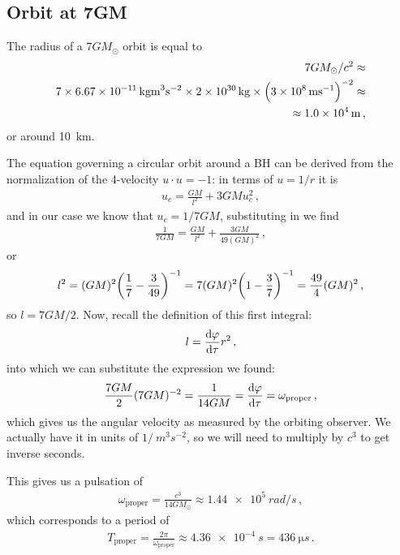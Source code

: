 \documentclass[main.tex]{subfiles}
\begin{document}
\subsection{Orbit at 7GM}

The radius of a \(7G M_{\odot}\) orbit is equal to 
%
\begin{align}
  7GM_{\odot}/c^2 \approx\\
  7 \times \SI{6.67e-11}{kg m^{3} s^{-2}} \times \SI{2e30}{kg} \times \qty(\SI{3e8}{ms^{-1}})^{-2} \approx \\
  \approx \SI{1.0e4}{m}
\,,
\end{align}
%
or around \SI{10}{km}. 

The equation governing a circular orbit around a BH can be derived from the normalization of the 4-velocity \(u \cdot u = -1\): in terms of \(u = 1/r\) it is 
%
\begin{align}
  u_c = \frac{GM}{l^2} + 3 GM u_c^2
\,,
\end{align}
%
and in our case we know that \(u_c = 1/7GM\), substituting in we find 
%
\begin{align}
  \frac{1}{7GM} = \frac{GM}{l^2} + \frac{3GM}{49 (GM)^2}
\,,
\end{align}
%
or 
%
\begin{align}
  l^2 = (GM)^2 \qty(\frac{1}{7} - \frac{3}{49})^{-1}
  = 7 (GM)^2 \qty(1 - \frac{3}{7})^{-1} = \frac{49}{4} (GM)^2
\,, 
\end{align}
%
so \(l = 7GM/2\). Now, recall the definition of this first integral: 
%
\begin{align}
  l = \dv{\varphi }{\tau } r^2
\,,
\end{align}
%
into which we can substitute the expression we found: 
%
\begin{align}
  \frac{7GM}{2} (7GM)^{-2} = \frac{1}{14GM} =  \dv{\varphi }{\tau } = \omega_{\text{proper}}
\,,
\end{align}
%
which gives us the angular velocity as measured by the orbiting observer. We actually have it in units of $1/\SI{}{m^3 s^{-2}}$, so we will need to multiply by \(c^3\) to get inverse seconds.

This gives us a pulsation of 
%
\begin{align}
  \omega _{\text{proper}} = \frac{c^3}{14GM_{\odot}} \approx 
  \SI{1.44e5}{rad/s}
\,,
\end{align}
%
which corresponds to a period of 
%
\begin{align}
  T _{\text{proper}} = \frac{2\pi}{\omega _{\text{proper}}} \approx \SI{4.36e-4}{s} = \SI{436}{\micro s}
\,.
\end{align}
\end{document}
